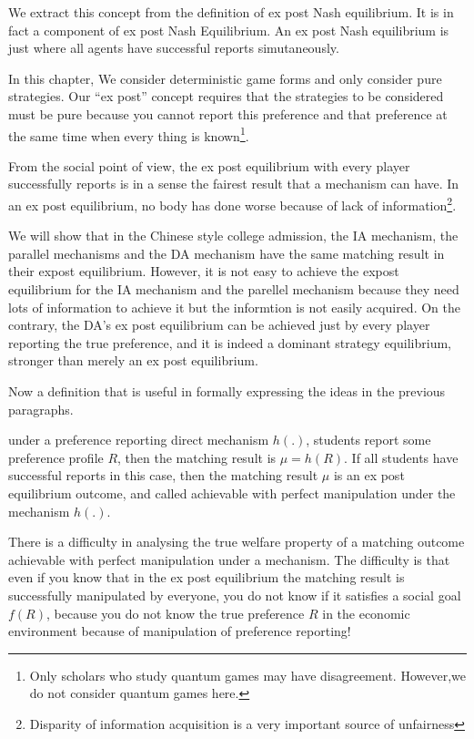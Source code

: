 We extract this concept from the definition of ex post Nash equilibrium. It is in fact a component of ex post Nash Equilibrium. An ex post Nash equilibrium is just where all agents have successful reports simutaneously. 


In this chapter, We consider deterministic game forms and only consider pure strategies. Our ``ex post'' concept requires that the strategies to be considered must be pure because you cannot report this preference and that preference at the same time when every thing is known\footnote{Only scholars who study quantum games may have disagreement. However,we do not consider quantum games here.}.

From the social point of view, the ex post equilibrium with every player successfully reports is in a sense the fairest result that a mechanism can have. In an ex post equilibrium, no body has done worse because of lack of information\footnote{Disparity of information acquisition is a very important source of unfairness}.


We will show that in the Chinese style college admission, the IA mechanism, the parallel mechanisms and the DA mechanism have the same matching result in their expost equilibrium. However, it is not 
easy to achieve the expost equilibrium for the IA mechanism and the parellel mechanism because they need lots of information to achieve it but the informtion is not easily acquired. On the contrary, the DA's ex post equilibrium can be achieved just by every player reporting the true preference, and it is indeed a dominant strategy equilibrium, stronger than merely an ex post equilibrium.

Now a definition that is useful in formally expressing the ideas in the previous paragraphs.
\begin{definition}
under a preference reporting direct mechanism $h(.)$, students report some preference profile $R$, then the matching result is $\mu=h(R)$.
If all students have successful reports in this case, then the matching result $\mu$ is an ex post equilibrium outcome, and called achievable with perfect manipulation under the mechanism $h(.)$.
\end{definition}

There is a difficulty in analysing the true welfare property of a matching outcome achievable with perfect manipulation under a mechanism. The difficulty is that  even if you know that in the ex post equilibrium the matching result
is successfully manipulated by everyone, you do not know if it
satisfies a social goal $f(R)$, because you do not know the true preference $R$ in the economic
environment because of manipulation of preference reporting!



